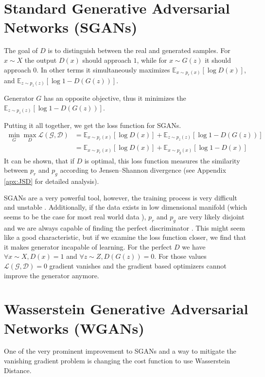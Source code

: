 \section{Standard Generative Adversarial Networks (SGANs)}
The goal of $D$ is to distinguish between the real and generated samples. For $x
\sim X$ the output $D(x)$ should approach $1$, while for $x \sim G(z)$ it should
approach $0$. In other terms it simultaneously maximizes $\mathbb{E}_{x \sim
  p_r(x)}[\log{D(x)}]$, and $\mathbb{E}_{z \sim p_z(z)}[\log{1 - D(G(z))}]$.

Generator $G$ has an opposite objective, thus it minimizes the $\mathbb{E}_{z
  \sim p_z(z)}[\log{1 - D(G(z))}]$.

Putting it all together, we get the loss function for SGANs.
\begin{equation}
  \begin{split}
  \min_G\max_D\mathcal{L(G, D)} & = \mathbb{E}_{x \sim p_r(x)}[\log{D(x)}] +  \mathbb{E}_{z \sim p_z(z)}[\log{1 - D(G(z))}] \\
  & = \mathbb{E}_{x \sim p_r(x)}[\log{D(x)}] +  \mathbb{E}_{x \sim p_g(x)}[\log{1 - D(x)}]
  \end{split}
\end{equation}
It can be shown, that if $D$ is optimal, this loss function measures the similarity between 
$p_r$ and $p_g$ according to Jensen–Shannon divergence (see Appendix
\ref{apx:JSD} for detailed analysis). 

SGANs are a very powerful tool, however, the training process is very difficult
and unstable \cite{salimans2016improved}. Additionally, if the data exists in
low dimensional manifold (which seems to be the case for most real world data
\cite{narayanan2010proceedings}), $p_r$ and $p_g$ are very likely disjoint and we are always capable of finding the perfect discriminator 
\cite{arjovsky2017principled}. This might seem like a good
characteristic, but if we examine the loss function closer, we find that it
makes generator incapable of learning. For the perfect $D$ we have $\forall x
\sim X, D(x) = 1$ and $\forall z \sim Z, D(G(z)) = 0$. For those values
$\mathcal{L(G,D)} = 0$ gradient vanishes and the gradient based optimizers cannot improve the
generator anymore.
\section{Wasserstein Generative Adversarial Networks (WGANs)}
One of the very prominent improvement to SGANs and a way to mitigate the
vanishing gradient problem is changing the cost function to use Wasserstein
Distance.

